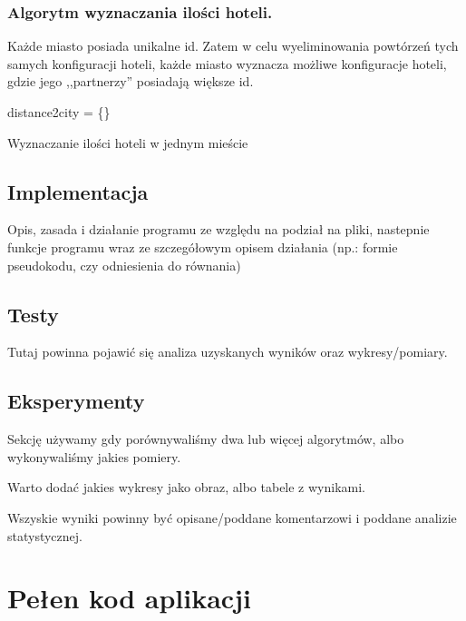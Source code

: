 \documentclass[12pt,a4paper]{article}
\begin{document}
	\subsubsection*{Algorytm wyznaczania ilości hoteli.}
	
	Każde miasto posiada unikalne id. Zatem w celu wyeliminowania powtórzeń tych samych konfiguracji hoteli, każde miasto wyznacza możliwe konfiguracje hoteli, gdzie jego ,,partnerzy'' posiadają większe id.

	\begin{algorithm}[h]
		distance2city = \{\} 
		\caption{Wyznaczanie ilości hoteli w jednym mieście}
	\end{algorithm}

	\subsection*{Implementacja}
	Opis, zasada i działanie programu ze względu na podział na pliki, nastepnie	funkcje programu wraz ze szczegółowym opisem działania (np.: formie pseudokodu, czy odniesienia do równania)
	\subsection*{Testy}
	Tutaj powinna pojawić się analiza uzyskanych wyników oraz wykresy/pomiary.
	
	\subsection*{Eksperymenty}
	Sekcję używamy gdy porównywaliśmy dwa lub więcej algorytmów, albo wykonywaliśmy jakies pomiery.
	
	Warto dodać jakies wykresy jako obraz, albo tabele z wynikami. 
	
	Wszyskie wyniki powinny być opisane/poddane komentarzowi i poddane analizie statystycznej.
	\newpage
	\section*{Pełen kod aplikacji}
\end{document}

